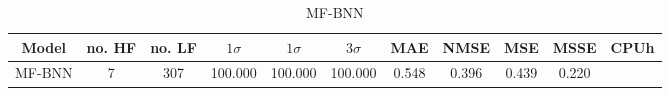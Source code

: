 \documentclass{article}
\begin{document}
\begin{table}[ht]
\centering
\begin{tabular}{|c|c|c|c|c|c|c|c|c|c|c|}
\hline
Model & no. HF & no. LF & $1\sigma$ & $1\sigma$ & $3\sigma$ & MAE & NMSE & MSE & MSSE & CPUh\\ \hline
MF-BNN & 7 & 307 & 100.000 & 100.000 & 100.000 & 0.548 & 0.396 & 0.439 & 0.220 &  \\ \hline
\end{tabular}
\caption{MF-BNN}
\label{tab:example}
\end{table}
\end{document}
